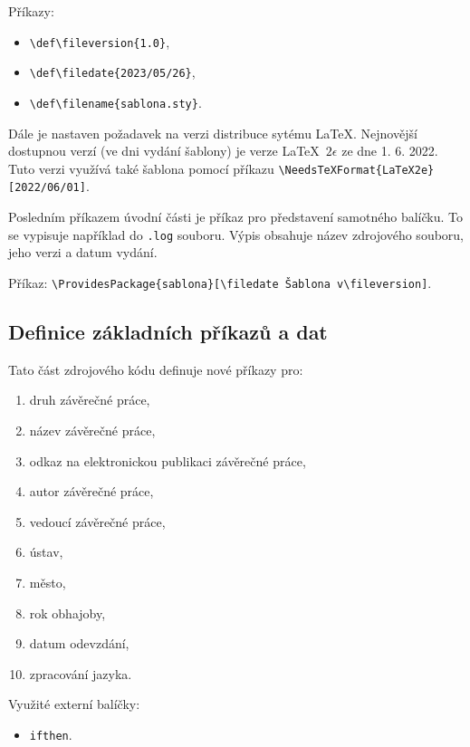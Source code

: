 Příkazy:

\begin{itemize}[label={-}]
	\item \verb|\def\fileversion{1.0}|,
	\item \verb|\def\filedate{2023/05/26}|,
	\item \verb|\def\filename{sablona.sty}|.
\end{itemize}

Dále je nastaven požadavek na verzi distribuce sytému \LaTeX. Nejnovější dostupnou verzí (ve dni vydání šablony) je verze \LaTeX\ $2\epsilon$ ze dne 1. 6. 2022. Tuto verzi využívá také šablona pomocí příkazu \verb|\NeedsTeXFormat{LaTeX2e}[2022/06/01]|.

Posledním příkazem úvodní části je příkaz pro představení samotného balíčku. To se vypisuje například do \verb|.log| souboru. Výpis obsahuje název zdrojového souboru, jeho verzi a datum vydání.

Příkaz: \verb|\ProvidesPackage{sablona}[\filedate Šablona v\fileversion]|.



\newpage
\subsection{Definice základních příkazů a dat}
\label{subsec:definice_prikazy}
Tato část zdrojového kódu definuje nové příkazy pro:

\begin{enumerate}
	\item druh závěrečné práce,
	\item název závěrečné práce,
	\item odkaz na elektronickou publikaci závěrečné práce,
	\item autor závěrečné práce,
	\item vedoucí závěrečné práce,
	\item ústav,
	\item město,
	\item rok obhajoby,
	\item datum odevzdání,
	\item zpracování jazyka.
\end{enumerate}

Využité externí balíčky:

\begin{itemize}[label={-}]
	\item \verb|ifthen|.
\end{itemize}



